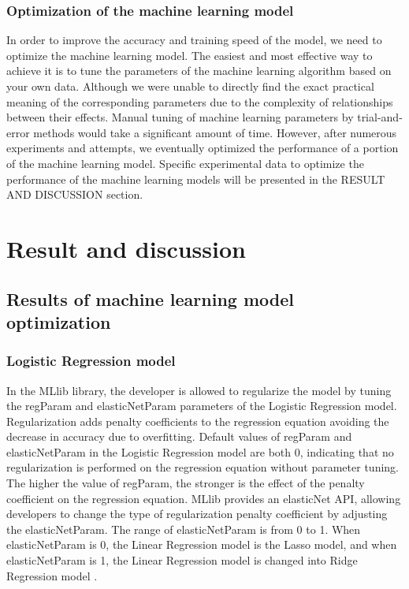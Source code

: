 \documentclass[conference]{IEEEtran}
\begin{document}
\subsubsection{Optimization of the machine learning model}
In order to improve the accuracy and training speed of the model, we need to optimize the machine learning model. The easiest and most effective way to achieve it is to tune the parameters of the machine learning algorithm based on your own data. Although we were unable to directly find the exact practical meaning of the corresponding parameters due to the complexity of relationships between their effects. Manual tuning of machine learning parameters by trial-and-error methods would take a significant amount of time\cite{b27}. However, after numerous experiments and attempts, we eventually optimized the performance of a portion of the machine learning model. Specific experimental data to optimize the performance of the machine learning models will be presented in the RESULT AND DISCUSSION section.



\section{Result and discussion}
\subsection{Results of machine learning model optimization}
\subsubsection{Logistic Regression model}
In the MLlib library, the developer is allowed to regularize the model by tuning the regParam and elasticNetParam parameters of the Logistic Regression model. Regularization adds penalty coefficients to the regression equation avoiding the decrease in accuracy due to overfitting\cite{b28}. Default values of regParam and elasticNetParam in the Logistic Regression model are both 0, indicating that no regularization is performed on the regression equation without parameter tuning. The higher the value of regParam, the stronger is the effect of the penalty coefficient on the regression equation. MLlib provides an elasticNet API, allowing developers to change the type of regularization penalty coefficient by adjusting the elasticNetParam. The range of elasticNetParam is from 0 to 1. When elasticNetParam is 0, the Linear Regression model is the Lasso model, and when elasticNetParam is 1, the Linear Regression model is changed into Ridge Regression model \cite{b29}. 
\end{document}
